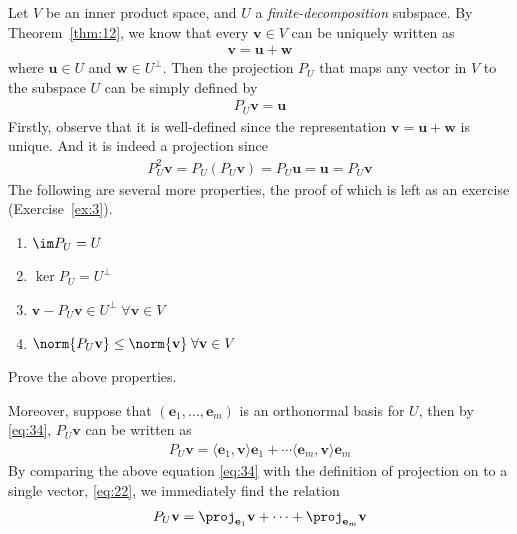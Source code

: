 \documentclass[thmcnt=section, color=blue, 12pt]{my-elegantbook}
\begin{document}
Let $V$ be an inner product space, and $U$ 
a \textit{finite-decomposition} subspace.
By Theorem~\ref{thm:12}, we know that every $\mathbf{v} \in V$ 
can be uniquely written as
\begin{align*}
	\mathbf{v} = \mathbf{u} + \mathbf{w}
\end{align*}
where $\mathbf{u} \in U$ and $\mathbf{w} \in U^\perp$.
Then the projection $P_U$ 
that maps any vector in $V$ to the subspace $U$
can be simply defined by
\begin{align*}
	P_U \mathbf{v} = \mathbf{u}
\end{align*}
Firstly, observe that it is well-defined since the 
representation $\mathbf{v} = \mathbf{u} + \mathbf{w}$ is unique.
And it is indeed a projection since 
\begin{align*}
	P^2_U \mathbf{v} = P_U (P_U \mathbf{v}) = P_U \mathbf{u} = \mathbf{u}
	= P_U \mathbf{v}
\end{align*}
The following are several more properties, 
the proof of which is left as an exercise (Exercise~\ref{ex:3}).
\begin{enumerate}
	\item $\im P_U = U$
	\item $\ker P_U = U^\perp$
	\item $\mathbf{v} - P_U \mathbf{v} \in U^\perp \; \forall \mathbf{v} \in V$
	\item $\norm{P_U \mathbf{v}} \leq \norm{\mathbf{v}} \; \forall \mathbf{v} \in V$
\end{enumerate}

\begin{exercise} \label{ex:3}
	Prove the above properties.
\end{exercise}

\begin{solution}
\end{solution}

Moreover, suppose that $(\mathbf{e}_1, \ldots, \mathbf{e}_m)$ is an orthonormal
basis for $U$, then by \eqref{eq:34}, $P_U \mathbf{v}$ can be written as 
\begin{align}
	P_U \mathbf{v} = \langle \mathbf{e}_1, \mathbf{v} \rangle \mathbf{e}_1
	+ \cdots \langle \mathbf{e}_m, \mathbf{v} \rangle \mathbf{e}_m
	\label{eq:34}
\end{align}
By comparing the above equation \eqref{eq:34} with the 
definition of projection on to a single vector, \eqref{eq:22},
we immediately find the relation 
\begin{align*}
	P_U \mathbf{v} = \proj_{\mathbf{e}_1} \mathbf{v}
	+ \cdots + \proj_{\mathbf{e}_m} \mathbf{v}
\end{align*}
\end{document}
